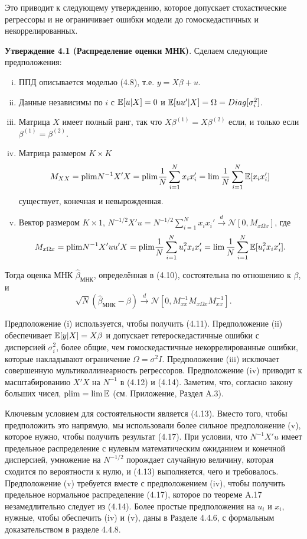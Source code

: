 Это приводит к следующему утверждению, которое допускает стохастические регрессоры и не ограничивает ошибки модели до гомоскедастичных и некоррелированных.

\textbf{Утверждение 4.1 (Распределение оценки МНК)}. Сделаем следующие предположения:
\begin{enumerate}[(i)]
 \item ППД описывается моделью (4.8), т.е. $y = X \beta +u$.
 \item Данные независимы по $i$ с $\mathbb{E}{[u|X]}=0$ и $\mathbb{E}{[uu'|X]}=\Omega = Diag[\sigma_i^2]$.
 \item Матрица $X$ имеет полный ранг, так что $X\beta^{(1)}=X\beta^{(2)}$ если, и только если $\beta^{(1)} = \beta^{(2)}$.
 \item Матрица размером $K \times K $
 \begin{equation}
 	M_{XX}= \mathrm{plim } N^{-1}X'X = \mathrm{plim } \frac{1}{N}\sum_{i=1}^N x_ix_i' = \lim \frac{1}{N} \sum_{i=1}^N \mathbb{E}{[x_i x_i']}
 \end{equation}
 существует, конечная и невырожденная.
 \item Вектор размером $K \times 1 $, $N^{-1/2}X'u=N^{-1/2}\sum_{i=1}^N x_ix_i' \xrightarrow{d} \mathcal{N}[0,M_{x \Omega x}] $, где
 \begin{equation}
 M_{x \Omega x} = \mathrm{plim } N^{-1} X'uu'X = \mathrm{plim } \frac{1}{N} \sum_{i=1}^N u_i^2 x_i x_i' = \lim \frac{1}{N} \sum_{i=1}^N \mathbb{E} [u_i^2 x_i x_i'].
 \end{equation}
\end{enumerate} 

Тогда оценка МНК $\hat{\beta}_{\text{МНК}}$, определённая в (4.10), состоятельна по отношению к $\beta$, и 
\begin{equation}
\sqrt{N}(\hat{\beta}_{\text{МНК}}-\beta) \xrightarrow{d} \mathcal{N} [0, M_{xx}^{-1}M_{x \Omega x} M_{xx}^{-1}].
\end{equation}


Предположение (i) используется, чтобы получить (4.11). Предположение (ii) обеспечивает $\mathbb{E} [y|X] = X\beta$  и допускает гетероскедастичные ошибки с дисперсией $\sigma_i^2$, более общие, чем гомоскедастичные некоррелированные ошибки, которые накладывают ограничение  $\Omega = \sigma^2 I$. Предположение (iii) исключает совершенную мультиколлинеарность регрессоров. Предположение (iv) приводит к масштабированию $X'X$ на $N^{-1}$  в (4.12) и (4.14). Заметим, что, согласно закону больших чисел, $\mathrm{plim } = \lim \mathbb{E}$ (см. Приложение, Раздел A.3).

Ключевым условием для состоятельности является (4.13). Вместо того, чтобы предположить это напрямую, мы использовали более сильное предположение (v), которое нужно, чтобы получить результат (4.17). При условии, что $N^{-1}X'u$ имеет предельное распределение с нулевым математическим ожиданием и конечной дисперсией, умножение на $N^{-1/2}$ порождает случайную величину, которая сходится по вероятности к нулю, и (4.13) выполняется, чего и требовалось. Предположение (v) требуется вместе с предположением (iv), чтобы получить предельное нормальное распределение (4.17), которое по теореме A.17 незамедлительно следует из (4.14). Более простые предположения на $u_i$ и $x_i$, нужные, чтобы обеспечить (iv) и (v), даны в Разделе 4.4.6, с формальным доказательством в разделе 4.4.8.

